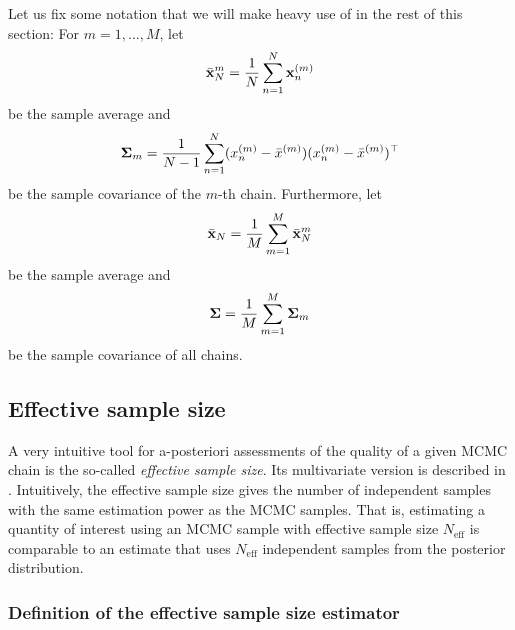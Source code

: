 \documentclass[10pt]{article}
\numberwithin{equation}{section}
\begin{document}
Let us fix some notation that we will make heavy use of in the rest of this section: For $m=1,\ldots, M$, let
\begin{align*}
\bar{\mathbf{x}}_N^{m} = \frac{1}{N} \sum_{n=1}^N \mathbf{x}_n^{(m)}
\end{align*}
be the sample average and
\begin{align*}
\mathbf{\Sigma}_m = \frac{1}{N-1} \sum_{n=1}^N (x_n^{(m)} - \bar x^{(m)}) (x_n^{(m)} - \bar x^{(m)})^\top
\end{align*}
be the sample covariance of the $m$-th chain. Furthermore, let
\begin{align*}
\bar{\mathbf{x}}_N = \frac{1}{M} \sum_{m=1}^M \bar{\mathbf{x}}_N^{m}
\end{align*}
be the sample average and
\begin{align*}
\mathbf{\Sigma} = \frac{1}{M} \sum_{m=1}^M \mathbf{\Sigma}_m
\end{align*}
be the sample covariance of all chains.



\subsection{Effective sample size}

A very intuitive tool for a-posteriori assessments of the quality of a given MCMC chain is the so-called \emph{effective sample size}. Its multivariate version is described in \cite{VatFleJon19}. Intuitively, the effective sample size gives the number of independent samples with the same estimation power as the MCMC samples. That is, estimating a quantity of interest using an MCMC sample with effective sample size $N_\text{eff}$ is comparable to an estimate that uses $N_\text{eff}$ independent samples from the posterior distribution.

\subsubsection*{Definition of the effective sample size estimator}
\end{document}
